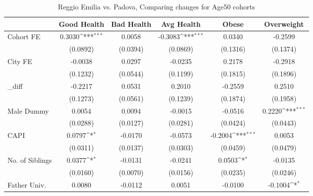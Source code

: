 \begin{table}[htbp]\centering
\def\sym#1{\ifmmode^{#1}\else\(^{#1}\)\fi}
\caption{Reggio Emilia vs. Padova, Comparing changes for Age50 cohorts}
\begin{tabular}{l*{5}{c}}
\toprule
            &\multicolumn{1}{c}{Good Health}&\multicolumn{1}{c}{Bad Health}&\multicolumn{1}{c}{Avg Health}&\multicolumn{1}{c}{Obese}&\multicolumn{1}{c}{Overweight}\\
\midrule
Cohort FE   &      0.3030\sym{***}&      0.0058         &     -0.3083\sym{***}&      0.0340         &     -0.2599         \\
            &    (0.0892)         &    (0.0394)         &    (0.0869)         &    (0.1316)         &    (0.1374)         \\
\addlinespace
City FE     &     -0.0038         &      0.0297         &     -0.0235         &      0.2178         &     -0.2918         \\
            &    (0.1232)         &    (0.0544)         &    (0.1199)         &    (0.1815)         &    (0.1896)         \\
\addlinespace
\_diff       &     -0.2217         &      0.0531         &      0.2010         &     -0.2559         &      0.2510         \\
            &    (0.1273)         &    (0.0561)         &    (0.1239)         &    (0.1874)         &    (0.1958)         \\
\addlinespace
Male Dummy  &      0.0054         &      0.0094         &     -0.0015         &     -0.0516         &      0.2220\sym{***}\\
            &    (0.0288)         &    (0.0127)         &    (0.0281)         &    (0.0424)         &    (0.0443)         \\
\addlinespace
CAPI        &      0.0797\sym{*}  &     -0.0170         &     -0.0573         &     -0.2004\sym{***}&      0.0053         \\
            &    (0.0311)         &    (0.0137)         &    (0.0303)         &    (0.0459)         &    (0.0479)         \\
\addlinespace
No. of Siblings&      0.0377\sym{*}  &     -0.0131         &     -0.0241         &      0.0503\sym{*}  &     -0.0135         \\
            &    (0.0160)         &    (0.0070)         &    (0.0156)         &    (0.0235)         &    (0.0246)         \\
\addlinespace
Father Univ.&      0.0080         &     -0.0112         &      0.0051         &     -0.0100         &     -0.1004\sym{*}  \\

\end{tabular}
\end{table}
